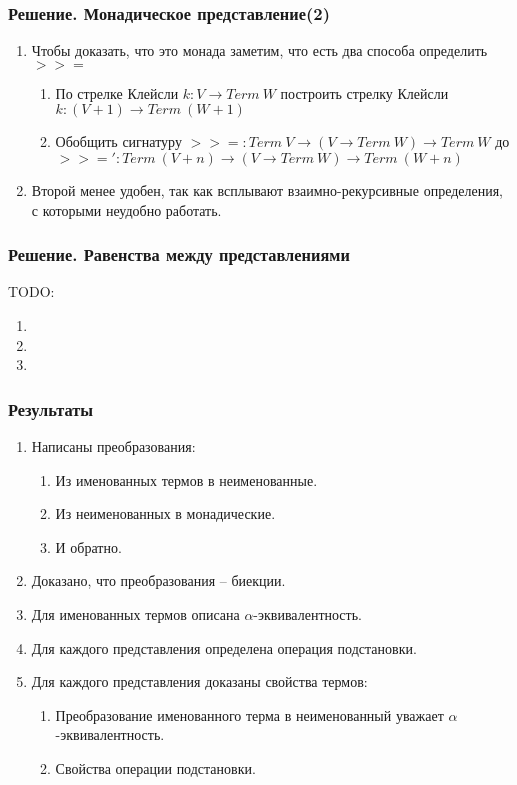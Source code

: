 \documentclass{beamer}
\begin{document}
\begin{frame}[fragile=singleslide]\frametitle{Решение. Монадическое представление(2)}
    \begin{enumerate}
        \item Чтобы доказать, что это монада заметим, что есть два способа определить $>>=$
          \begin{enumerate}
            \item По стрелке Клейсли $k : V \to Term\ W$ построить стрелку Клейсли $k : (V + 1) \to Term\ (W + 1)$
            \item Обобщить сигнатуру $>>= : Term\ V \to (V \to Term\ W) \to Term\ W$ до $>>=' : Term\ (V + n) \to (V \to Term\ W) \to Term\ (W + n)$
          \end{enumerate}
        \item Второй менее удобен, так как всплывают взаимно-рекурсивные определения, с которыми неудобно работать.
    \end{enumerate}
\end{frame}


\begin{frame}[fragile=singleslide]\frametitle{Решение. Равенства между представлениями}
    TODO:
    \begin{enumerate}
        \item
        \item
        \item
    \end{enumerate}
\end{frame}


\begin{frame}\frametitle{Результаты}
    \begin{enumerate}
        \item Написаны преобразования:
            \begin{enumerate}
                \item Из именованных термов в неименованные.
                \item Из неименованных в монадические.
                \item И обратно.
            \end{enumerate}
        \item Доказано, что преобразования -- биекции.
        \item Для именованных термов описана $\alpha$-эквивалентность.
        \item Для каждого представления определена операция подстановки.
        \item Для каждого представления доказаны свойства термов:
            \begin{enumerate}
                \item Преобразование именованного терма в неименованный уважает $\alpha$-эквивалентность.
                \item Свойства операции подстановки.
            \end{enumerate}
    \end{enumerate}
\end{frame}
\end{document}
